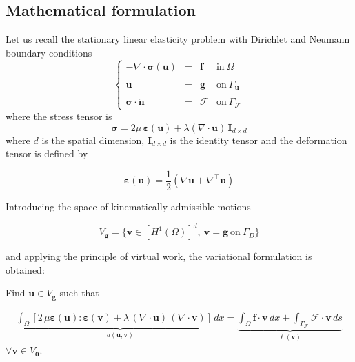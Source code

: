 \subsection{Mathematical formulation}

Let us recall the stationary linear elasticity problem with
Dirichlet and Neumann boundary conditions
\begin{equation}
\left \{
\begin{array}{rcll}
-\nabla \cdot \boldsymbol{\sigma} (\mathbf{u}) & = & \mathbf{f} & \mbox{in}~\Omega \\
& & & \\
\mathbf{u} & = & \mathbf{g} & \mbox{on}~\Gamma_{\mathbf{u}} \\
& & & \\
\boldsymbol{\sigma} \cdot \check{\mathbf{n}} & = & \boldsymbol{\mathcal{F}} & \mbox{on}~\Gamma_{\boldsymbol{\mathcal{F}}}
\end{array}
\right.
\end{equation}
where the stress tensor is
$$
\boldsymbol{\sigma} = 2\mu\, \boldsymbol{\varepsilon}({\mathbf{u}})+ \lambda \left ( \nabla\cdot\mathbf{u} \right )\, \mathbf{I}_{d \times d}
$$
where $d$ is the spatial dimension, $\mathbf{I}_{d \times d}$ is 
the identity tensor and the deformation tensor is defined by

$$
\boldsymbol{\varepsilon}({\mathbf{u}}) = \frac12 (\nabla{\mathbf{u}} + \nabla^{\intercal}{\mathbf{u}})
$$

Introducing the space of kinematically admissible motions

$$
V_{\mathbf{g}} = \{\mathbf{v} \in \left [ H^1(\Omega) \right ]^d,~\mathbf{v} = \mathbf{g}~\mbox{on}~\Gamma_D\}
$$

and applying the principle of virtual work, the variational formulation is obtained: 

\begin{kaobox}[frametitle=Weak form of the Elastostatic problem]
Find $\mathbf{u} \in V_{\mathbf{g}}$ such that

\begin{eqnarray}
\underbrace{\int_{\Omega}{\left [2\,\mu \boldsymbol{\varepsilon}(\mathbf{u}) : \boldsymbol{\varepsilon}(\mathbf{v})
		+ \lambda\, (\nabla \cdot \mathbf{u})\,(\nabla \cdot \mathbf{v}) \right ]\,dx}}_{a(\mathbf{u},\mathbf{v})} =
\underbrace{\int_{\Omega}{\mathbf{f}\cdot \mathbf{v}}\,dx +
	\int_{\Gamma_{\boldsymbol{\mathcal{F}}}}{\boldsymbol{\mathcal{F}} \cdot \mathbf{v}}\,ds}_{\ell(\mathbf{v})}\nonumber
\end{eqnarray}
$\forall \mathbf{v} \in V_{\mathbf{0}}$.
\end{kaobox}


